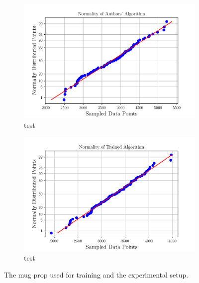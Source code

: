 \begin{figure}[!h]
	\centering
	\begin{subfigure}[b]{0.48\textwidth}
		\centering
		\includegraphics[width=\textwidth]{chapters/3-in-hand-manipulation/fig/sampled-data-points-vs-normally-distributed-points-authors.pdf}
		\caption{test}
		\label{fig:sampled-data-points-vs-normally-distributed-points-authors}
	\end{subfigure}
	\hfill
	\begin{subfigure}[b]{0.48\textwidth}
		\centering
		\includegraphics[width=\textwidth]{chapters/3-in-hand-manipulation/fig/sampled-data-points-vs-normally-distributed-points-trained.pdf}
		\caption{test}
		\label{fig:sampled-data-points-vs-normally-distributed-points-trained}
	\end{subfigure}
	\caption{The mug prop used for training and the experimental setup.}
	\label{fig:sampled-data-points-vs-normally-distributed-points-trained-authors}
\end{figure}


